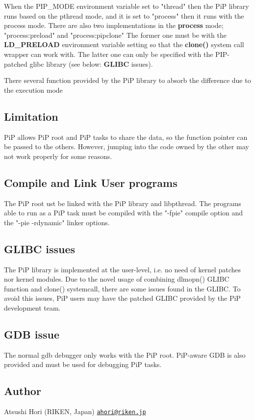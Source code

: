 When the {\ttfamily P\-I\-P\-\_\-\-M\-O\-D\-E} environment variable set to "thread" then the Pi\-P library runs based on the pthread mode, and it is set to "process" then it runs with the process mode. There are also two implementations in the {\bfseries process} mode; "process\-:preload" and "process\-:pipclone" The former one must be with the {\bfseries L\-D\-\_\-\-P\-R\-E\-L\-O\-A\-D} environment variable setting so that the {\bfseries clone()} system call wrapper can work with. The latter one can only be specified with the P\-I\-P-\/patched glibc library (see below\-: {\bfseries G\-L\-I\-B\-C} issues).

There several function provided by the Pi\-P library to absorb the difference due to the execution mode\hypertarget{group__pip-overview_limitation}{}\subsection{Limitation}\label{group__pip-overview_limitation}
Pi\-P allows Pi\-P root and Pi\-P tasks to share the data, so the function pointer can be passed to the others. However, jumping into the code owned by the other may not work properly for some reasons.\hypertarget{group__pip-overview_compile-and-link}{}\subsection{Compile and Link User programs}\label{group__pip-overview_compile-and-link}
The Pi\-P root ust be linked with the Pi\-P library and libpthread. The programs able to run as a Pi\-P task must be compiled with the "-\/fpie" compile option and the "-\/pie -\/rdynamic" linker options.\hypertarget{group__pip-overview_glibc-issues}{}\subsection{G\-L\-I\-B\-C issues}\label{group__pip-overview_glibc-issues}
The Pi\-P library is implemented at the user-\/level, i.\-e. no need of kernel patches nor kernel modules. Due to the novel usage of combining {\ttfamily dlmopn()} G\-L\-I\-B\-C function and {\ttfamily clone()} systemcall, there are some issues found in the G\-L\-I\-B\-C. To avoid this issues, Pi\-P users may have the patched G\-L\-I\-B\-C provided by the Pi\-P development team.\hypertarget{group__pip-overview_gdb-issue}{}\subsection{G\-D\-B issue}\label{group__pip-overview_gdb-issue}
The normal gdb debugger only works with the Pi\-P root. Pi\-P-\/aware G\-D\-B is also provided and must be used for debugging Pi\-P tasks.\hypertarget{group__pip-overview_author}{}\subsection{Author}\label{group__pip-overview_author}
Atsushi Hori (R\-I\-K\-E\-N, Japan) \href{mailto:ahori@riken.jp}{\tt ahori@riken.\-jp} 